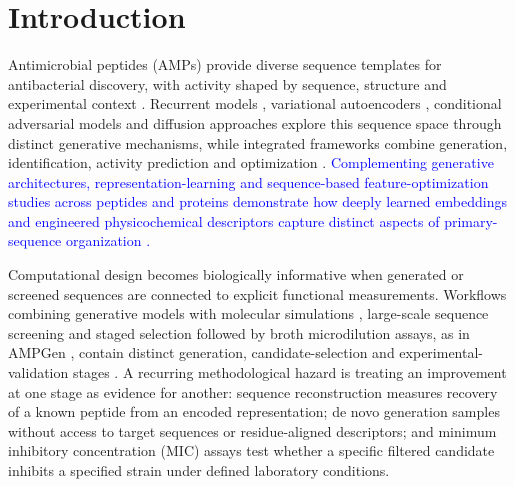 \documentclass[unnumsec,webpdf,contemporary,large]{oup-authoring-template}
\newcommand{\rev}[1]{\textcolor{blue}{#1}}
\begin{document}
\section{Introduction}

Antimicrobial peptides (AMPs) provide diverse sequence templates for antibacterial discovery, with activity shaped by sequence, structure and experimental context \cite{ref50,ref51}. Recurrent models \cite{ref1}, variational autoencoders \cite{ref16,ref17,ref2}, conditional adversarial models \cite{ref15,ref19} and diffusion approaches \cite{ref9,ref11,ref20} explore this sequence space through distinct generative mechanisms, while integrated frameworks combine generation, identification, activity prediction and optimization \cite{ref21}. \rev{Complementing generative architectures, representation-learning and sequence-based feature-optimization studies across peptides and proteins demonstrate how deeply learned embeddings and engineered physicochemical descriptors capture distinct aspects of primary-sequence organization \cite{refLe2022,refLe2021,refAMPScanner}.}

Computational design becomes biologically informative when generated or screened sequences are connected to explicit functional measurements. Workflows combining generative models with molecular simulations \cite{ref14,refCao2023}, large-scale sequence screening \cite{ref22} and staged selection followed by broth microdilution assays, as in AMPGen \cite{ref9}, contain distinct generation, candidate-selection and experimental-validation stages \cite{ref25}. A recurring methodological hazard is treating an improvement at one stage as evidence for another: sequence reconstruction measures recovery of a known peptide from an encoded representation; de novo generation samples without access to target sequences or residue-aligned descriptors; and minimum inhibitory concentration (MIC) assays test whether a specific filtered candidate inhibits a specified strain under defined laboratory conditions.
\end{document}
